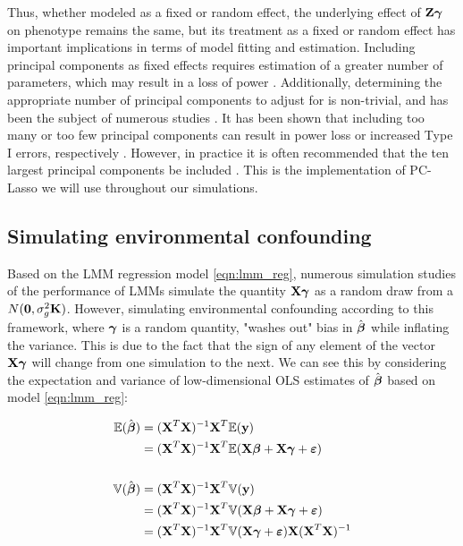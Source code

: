 Thus, whether modeled as a fixed or random effect, the underlying effect of $\textbf{Z} \boldsymbol{\gamma}$ on phenotype remains the same, but its treatment as a fixed or random effect has important implications in terms of model fitting and estimation. Including principal components as fixed effects requires estimation of a greater number of parameters, which may result in a loss of power \cite{zhang2015principal}. Additionally, determining the appropriate number of principal components to adjust for is non-trivial, and has been the subject of numerous studies \cite{patterson2006population, zhao2018practical}. It has been shown that including too many or too few principal components can result in power loss or increased Type I errors, respectively \cite{zhang2015principal}. However, in practice it is often recommended that the ten largest principal components be included \cite{zhao2018practical}. This is the implementation of PC-Lasso we will use throughout our simulations.


\subsection{Simulating environmental confounding}
Based on the LMM regression model \ref{eqn:lmm_reg}, numerous simulation studies of the performance of LMMs \cite{Rakitsch2012, bhatnagar2019simultaneous} simulate the quantity $\textbf{X}\boldsymbol{\gamma}$ as a random draw from a $N(\boldsymbol{0}, \sigma^2_g \textbf{K})$. However, simulating environmental confounding according to this framework, where $\boldsymbol{\gamma}$ is a random quantity, "washes out" bias in $\hat{\boldsymbol{\beta}}$ while inflating the variance. This is due to the fact that the sign of any element of the vector $\textbf{X}\boldsymbol{\gamma}$ will change from one simulation to the next. We can see this by considering the expectation and variance of low-dimensional OLS estimates of $\hat{\boldsymbol{\beta}}$ based on model \ref{eqn:lmm_reg}:

\begin{align*}
    \mathbb{E}(\hat{\boldsymbol{\beta}}) &= (\textbf{X}^T \textbf{X})^{-1} \textbf{X}^T \mathbb{E}(\textbf{y})\\
    &=  (\textbf{X}^T \textbf{X})^{-1} \textbf{X}^T \mathbb{E}(\textbf{X}\boldsymbol{\beta} + \textbf{X}\boldsymbol{\gamma} + \boldsymbol{\varepsilon})\\
    &\quad\\
    \mathbb{V}(\hat{\boldsymbol{\beta}}) &= (\textbf{X}^T \textbf{X})^{-1} \textbf{X}^T \mathbb{V}(\textbf{y})\\
    &=  (\textbf{X}^T \textbf{X})^{-1} \textbf{X}^T \mathbb{V}(\textbf{X}\boldsymbol{\beta} + \textbf{X}\boldsymbol{\gamma} + \boldsymbol{\varepsilon})\\
    &=  (\textbf{X}^T \textbf{X})^{-1} \textbf{X}^T \mathbb{V}(\textbf{X}\boldsymbol{\gamma} + \boldsymbol{\varepsilon}) \textbf{X}  (\textbf{X}^T \textbf{X})^{-1}
\end{align*}

